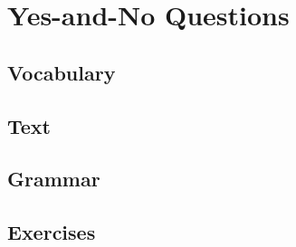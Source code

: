 \chapter{Yes-and-No Questions}
\section*{Vocabulary}
\section*{Text}
\section*{Grammar}
\section*{Exercises}
